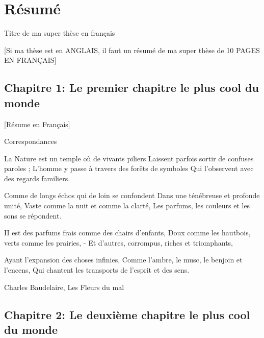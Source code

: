 \chapter*{Résumé}

\vspace{1.5cm}
    {\Huge Titre de ma super thèse en français}

\vspace{1.5cm}

\newpage
\raggedbottom

\onehalfspacing
\setcounter{footnote}{0}
\renewcommand{\thefootnote}{\arabic{footnote}}

[Si ma thèse est en ANGLAIS, il faut un résumé de ma super thèse de 10 PAGES EN FRANÇAIS]\newline {}


\section*{Chapitre 1: Le premier chapitre le plus cool du monde}

[Résume en Français]\newline \newline


Correspondances

La Nature est un temple où de vivants piliers
Laissent parfois sortir de confuses paroles ;
L'homme y passe à travers des forêts de symboles
Qui l'observent avec des regards familiers.

Comme de longs échos qui de loin se confondent
Dans une ténébreuse et profonde unité,
Vaste comme la nuit et comme la clarté,
Les parfums, les couleurs et les sons se répondent.

II est des parfums frais comme des chairs d'enfants,
Doux comme les hautbois, verts comme les prairies,
- Et d'autres, corrompus, riches et triomphants,

Ayant l'expansion des choses infinies,
Comme l'ambre, le musc, le benjoin et l'encens,
Qui chantent les transports de l'esprit et des sens.


   Charles Baudelaire, Les Fleurs du mal


\section*{Chapitre 2: Le deuxième chapitre le plus cool du monde}

